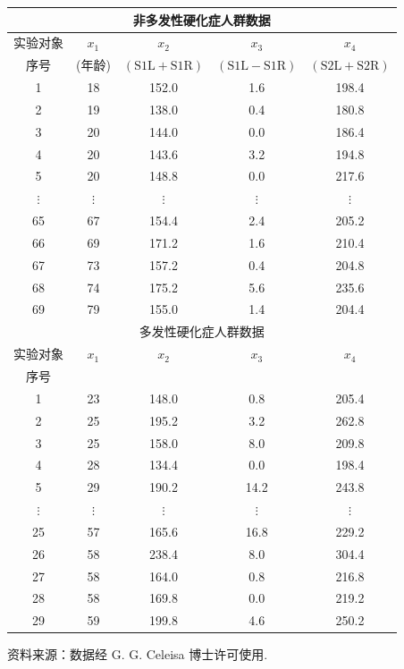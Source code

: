 \begin{mvtable}
\label{tab:1.6}
\begin{tabular}{ccccc}
\toprule
\multicolumn{5}{c}{非多发性硬化症人群数据} \\
\midrule
实验对象 & $x_1$ & $x_2$ & $x_3$ & $x_4$ \\
序号 & (年龄) & $(\mathrm{S1L}+\mathrm{S1R})$ & $(\mathrm{S1L}-\mathrm{S1R})$ & $(\mathrm{S2L}+\mathrm{S2R})$ \\
\midrule
1 & 18 & 152.0 & 1.6 & 198.4 \\
2 & 19 & 138.0 & 0.4 & 180.8 \\
3 & 20 & 144.0 & 0.0 & 186.4 \\
4 & 20 & 143.6 & 3.2 & 194.8 \\
5 & 20 & 148.8 & 0.0 & 217.6 \\
$\vdots$ & $\vdots$ & $\vdots$ & $\vdots$ & $\vdots$ \\
65 & 67 & 154.4 & 2.4 & 205.2 \\
66 & 69 & 171.2 & 1.6 & 210.4 \\
67 & 73 & 157.2 & 0.4 & 204.8 \\
68 & 74 & 175.2 & 5.6 & 235.6 \\
69 & 79 & 155.0 & 1.4 & 204.4 \\
\midrule
\multicolumn{5}{c}{多发性硬化症人群数据} \\
\midrule
实验对象 & $x_1$ & $x_2$ & $x_3$ & $x_4$ \\
序号 &  &  &  &  \\
\midrule
1 & 23 & 148.0 & 0.8 & 205.4 \\
2 & 25 & 195.2 & 3.2 & 262.8 \\
3 & 25 & 158.0 & 8.0 & 209.8 \\
4 & 28 & 134.4 & 0.0 & 198.4 \\
5 & 29 & 190.2 & 14.2 & 243.8 \\
$\vdots$ & $\vdots$ & $\vdots$ & $\vdots$ & $\vdots$ \\
25 & 57 & 165.6 & 16.8 & 229.2 \\
26 & 58 & 238.4 & 8.0 & 304.4 \\
27 & 58 & 164.0 & 0.8 & 216.8 \\
28 & 58 & 169.8 & 0.0 & 219.2 \\
29 & 59 & 199.8 & 4.6 & 250.2 \\
\bottomrule
\end{tabular}
\end{mvtable}

{ 资料来源：数据经 G. G. Celeisa 博士许可使用.}

